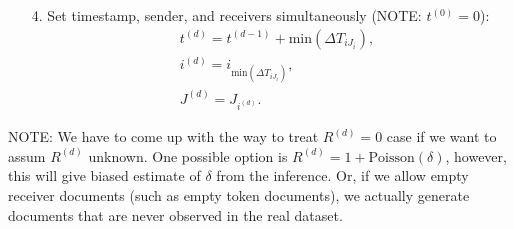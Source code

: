 \documentclass[a4paper]{article}
\begin{document}
\begin{itemize}
	 	 \item[4.] Set timestamp, sender, and receivers simultaneously (NOTE: $t^{(0)}=0$):
	 	 \begin{equation}
	 	 \begin{aligned}
	 	 &t^{(d)} = t^{(d-1)}+\mbox{min}(\Delta T_{i{J_i}}),\\
	 	  &i^{(d)} = i_{\mbox{min}(\Delta T_{i{J_i}})}, \\
	 	  &J^{(d)} = J_{i^{(d)}}.
	 	  \end{aligned}
	 	 \end{equation}
\end{itemize}
NOTE: We have to come up with the way to treat $R^{(d)}=0$ case if we want to assum $R^{(d)}$ unknown. One possible option is $R^{(d)} = 1 + \mbox{Poisson}(\delta)$, however, this will give biased estimate of $\delta$ from the inference. Or, if we allow empty receiver documents (such as empty token documents), we actually generate documents that are never observed in the real dataset.
\end{document}
